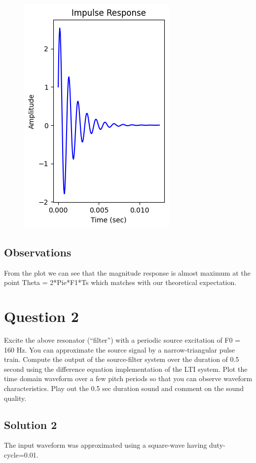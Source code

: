 \documentclass{article}
\begin{document}
\begin{figure}[H]
\begin{center}
\includegraphics[scale = 0.5]{Q1_Impulse.png}
\end{center}
\end{figure}

\subsection{Observations}

From the plot we can see that the magnitude response is almost maximum at the point Theta = 2*Pie*F1*Ts which matches with our theoretical expectation.

\section{Question 2}

Excite the above resonator (“filter”) with a periodic source excitation of F0 = 160 Hz. You can approximate the source signal by a narrow-triangular pulse train. Compute the output of the source-filter system over the duration of 0.5 second using the difference equation implementation of the LTI system. Plot the time domain waveform over a few pitch periods so that you can observe waveform characteristics. Play out the 0.5 sec duration sound and comment on the sound quality.

\subsection{Solution 2}
The input waveform was approximated using a square-wave having duty-cycle=0.01. \\
\end{document}

